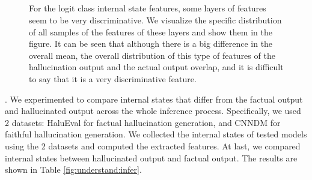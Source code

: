 \begin{figure}[t]
\centering
      \begin{minipage}{\columnwidth}
          {}
      \end{minipage}
      \\
      \\
      \\
      \\
      \caption{
      For the logit class internal state features, some layers of features seem to be very discriminative. We visualize the specific distribution of all samples of the features of these layers and show them in the figure. It can be seen that although there is a big difference in the overall mean, the overall distribution of this type of features of the hallucination output and the actual output overlap, and it is difficult to say that it is a very discriminative feature.
      }
    \label{fig:understand:key:logit}
\end{figure}

.
We experimented to compare internal states that differ from the factual output and hallucinated output across the whole inference process.
Specifically, we used 2 datasets: HaluEval for factual hallucination generation, and CNNDM for faithful hallucination generation.
We collected the internal states of tested models using the 2 datasets and computed the extracted features.
At last, we compared internal states between hallucinated output and factual output.
The results are shown in Table \ref{fig:understand:infer}.

